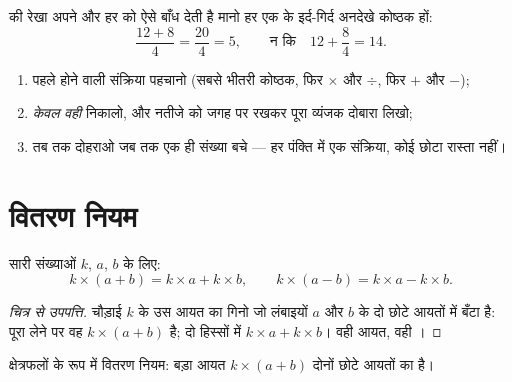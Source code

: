 \begin{remark}[भिन्न की रेखा में कोष्ठक छिपे होते हैं]
 की रेखा अपने  और हर को ऐसे बाँध देती है मानो हर एक के
इर्द-गिर्द अनदेखे कोष्ठक हों:
\[
\frac{12 + 8}{4} = \frac{20}{4} = 5,
\qquad\text{न कि}\quad 12 + \frac{8}{4} = 14 .
\]
\end{remark}

\begin{method}[सुरक्षित गणना]\label{met:g7:priorities:safe}
\begin{enumerate}
  \item पहले होने वाली संक्रिया पहचानो (सबसे भीतरी कोष्ठक, फिर
        $\times$ और $\div$, फिर $+$ और $-$);
  \item \emph{केवल वही} निकालो, और नतीजे को जगह पर रखकर पूरा
        व्यंजक दोबारा लिखो;
  \item तब तक दोहराओ जब तक एक ही संख्या बचे --- हर पंक्ति में एक
        संक्रिया, कोई छोटा रास्ता नहीं।
\end{enumerate}
\end{method}

\section{वितरण नियम}

\begin{theorem}[वितरण नियम]\label{thm:g7:priorities:distributivity}
सारी संख्याओं $k$, $a$, $b$ के लिए:
\[
k \times (a + b) = k \times a + k \times b,
\qquad
k \times (a - b) = k \times a - k \times b .
\]
\end{theorem}

\begin{proof}[चित्र से उपपत्ति]
चौड़ाई $k$ के उस आयत का  गिनो जो लंबाइयों $a$ और $b$ के
दो छोटे आयतों में बँटा है: पूरा लेने पर वह $k \times (a+b)$ है;
दो हिस्सों में $k \times a + k \times b$। वही आयत, वही
।
\end{proof}

\begin{omfigure}

{\small क्षेत्रफलों के रूप में वितरण नियम: बड़ा आयत
$k \times (a + b)$ दोनों छोटे आयतों का  है।}
\end{omfigure}

